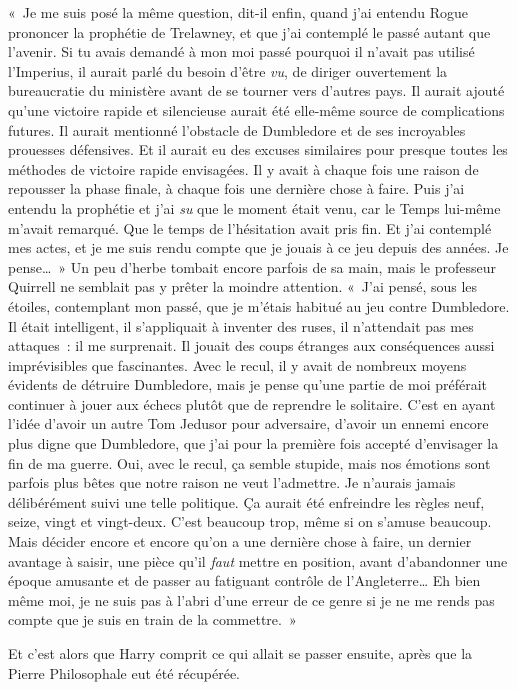 «~Je me suis posé la même question, dit-il enfin, quand j'ai entendu Rogue prononcer la prophétie de Trelawney, et que j'ai contemplé le passé autant que l'avenir.
Si tu avais demandé à mon moi passé pourquoi il n'avait pas utilisé l'Imperius, il aurait parlé du besoin d'être \emph{vu}, de diriger ouvertement la bureaucratie du ministère avant de se tourner vers d'autres pays.
Il aurait ajouté qu'une victoire rapide et silencieuse aurait été elle-même source de complications futures.
Il aurait mentionné l'obstacle de Dumbledore et de ses incroyables prouesses défensives.
Et il aurait eu des excuses similaires pour presque toutes les méthodes de victoire rapide envisagées.
Il y avait à chaque fois une raison de repousser la phase finale, à chaque fois une dernière chose à faire.
Puis j'ai entendu la prophétie et j'ai \emph{su} que le moment était venu, car le Temps lui-même m'avait remarqué.
Que le temps de l'hésitation avait pris fin.
Et j'ai contemplé mes actes, et je me suis rendu compte que je jouais à ce jeu depuis des années.
Je pense…~»
Un peu d'herbe tombait encore parfois de sa main, mais le professeur Quirrell ne semblait pas y prêter la moindre attention.
«~J'ai pensé, sous les étoiles, contemplant mon passé, que je m'étais habitué au jeu contre Dumbledore.
Il était intelligent, il s'appliquait à inventer des ruses, il n'attendait pas mes attaques~: il me surprenait.
Il jouait des coups étranges aux conséquences aussi imprévisibles que fascinantes.
Avec le recul, il y avait de nombreux moyens évidents de détruire Dumbledore, mais je pense qu'une partie de moi préférait continuer à jouer aux échecs plutôt que de reprendre le solitaire.
C'est en ayant l'idée d'avoir un autre Tom Jedusor pour adversaire, d'avoir un ennemi encore plus digne que Dumbledore, que j'ai pour la première fois accepté d'envisager la fin de ma guerre.
Oui, avec le recul, ça semble stupide, mais nos émotions sont parfois plus bêtes que notre raison ne veut l'admettre.
Je n'aurais jamais délibérément suivi une telle politique.
Ça aurait été enfreindre les règles neuf, seize, vingt et vingt-deux.
C'est beaucoup trop, même si on s'amuse beaucoup.
Mais décider encore et encore qu'on a une dernière chose à faire, un dernier avantage à saisir, une pièce qu'il \emph{faut} mettre en position, avant d'abandonner une époque amusante et de passer au fatiguant contrôle de l'Angleterre…
Eh bien même moi, je ne suis pas à l'abri d'une erreur de ce genre si je ne me rends pas compte que je suis en train de la commettre.~»

Et c'est alors que Harry comprit ce qui allait se passer ensuite, après que la Pierre Philosophale eut été récupérée.

